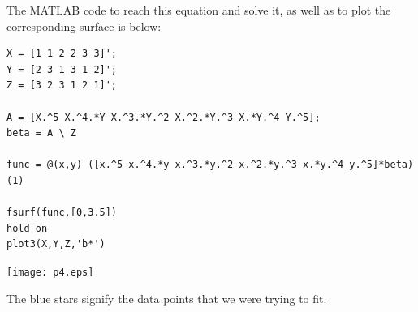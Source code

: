 \documentclass[12pt]{amsart}
\begin{document}
\begin{enumerate}
The MATLAB code to reach this equation and solve it, as
well as to plot the corresponding surface is below:

\begin{verbatim}
X = [1 1 2 2 3 3]';
Y = [2 3 1 3 1 2]';
Z = [3 2 3 1 2 1]';

A = [X.^5 X.^4.*Y X.^3.*Y.^2 X.^2.*Y.^3 X.*Y.^4 Y.^5];
beta = A \ Z

func = @(x,y) ([x.^5 x.^4.*y x.^3.*y.^2 x.^2.*y.^3 x.*y.^4 y.^5]*beta)(1)

fsurf(func,[0,3.5])
hold on
plot3(X,Y,Z,'b*')

\end{verbatim}

\texttt{[image: p4.eps]}

The blue stars signify the data points that we were trying to fit.

\end{enumerate}
\end{document}

